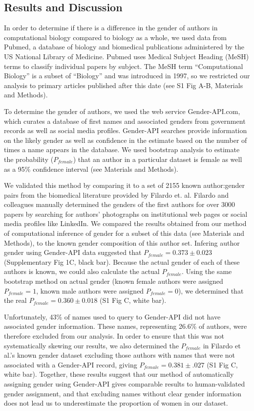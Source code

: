 \documentclass[10pt,letterpaper]{article}
\begin{document}
\begin{flushleft}
\section*{Results and Discussion}
In order to determine if there is a difference in the gender of authors in computational biology compared to biology as a whole, we used data from Pubmed, a database of biology and biomedical publications administered by the US National Library of Medicine. Pubmed uses Medical Subject Heading (MeSH) terms to classify individual papers by subject. The MeSH term “Computational Biology” is a subset of “Biology” and was introduced in 1997, so we restricted our analysis to primary articles published after this date (see S1 Fig A-B, Materials and Methods).

To determine the gender of authors, we used the web service Gender-API.com, which curates a database of first names and associated genders from government records as well as social media profiles. Gender-API searches provide information on the likely gender as well as confidence in the estimate based on the number of times a name appears in the database. We used bootstrap analysis to estimate the probability ($P_{female}$) that an author in a particular dataset is female as well as a 95\% confidence interval (see Materials and Methods).

We validated this method by comparing it to a set of 2155 known author:gender pairs from the biomedical literature provided by Filardo et. al. \cite{Filardo2016} Filardo and colleagues manually determined the genders of the first authors for over 3000 papers by searching for authors’ photographs on institutional web pages or social media profiles like LinkedIn. We compared the results obtained from our method of computational inference of gender for a subset of this data (see Materials and Methods), to the known gender composition of this author set. Infering author gender using Gender-API data suggested that $P_{female} = 0.373 \pm 0.023$ (Supplementary Fig 1C, black bar). Because the actual gender of each of these authors is known, we could also calculate the actual $P_{female}$. Using the same bootstrap method on actual gender (known female authors were assigned $P_{female} = 1$, known male authors were assigned $P_{female} = 0$), we determined that the real $P_{female} = 0.360 \pm 0.018$ (S1 Fig C, white bar).

Unfortunately, 43\% of names used to query to Gender-API did not have associated gender information. These names, representing 26.6\% of authors, were therefore excluded from our analysis. In order to ensure that this was not systematically skewing our results, we also determined the $P_{female}$ in Filardo et al.'s known gender dataset excluding those authors with names that were not associated with a Gender-API record, giving $P_{female} = 0.381 \pm .027$ (S1 Fig C, white bar). Together, these results suggest that our method of automatically assigning gender using Gender-API gives comparable results to human-validated gender assignment, and that excluding names without clear gender information does not lead us to underestimate the proportion of women in our dataset.


\end{flushleft}
\end{document}
